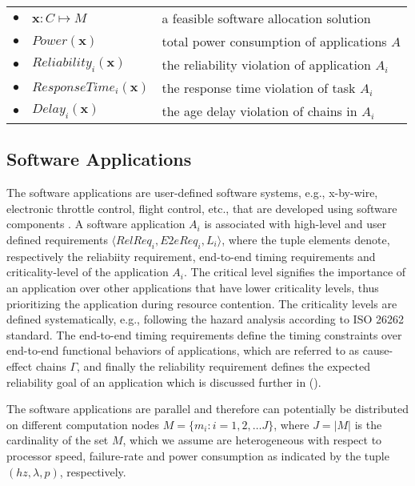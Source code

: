 \begin{table}[]
\begin{tabular}{@{}llp{}@{}}
$\bullet$ & $\textbf{x}:C\mapsto M$            & a feasible software allocation solution                  \\
$\bullet$ & $Power(\textbf{x})$                & total power consumption of applications $A$               \\
$\bullet$ & $Reliability_{i}(\textbf{x})$      & the reliability violation of application $A_i$              \\
$\bullet$ & $ResponseTime_{i}(\textbf{x})$     & the response time violation of task $A_i$                       \\
$\bullet$ & $Delay_{i}(\textbf{x})$            & the age delay violation of chains in $A_i$         \\
\bottomrule
\end{tabular}
\end{table}

\subsection{Software Applications}
The software applications are user-defined software systems, e.g., x-by-wire, electronic throttle control, flight control, etc., that are developed using software components \cite{softwarecomponents}\cite{Crnkovic2002BuildingSystems}. A software application $A_i$ is associated with high-level and user defined requirements $\langle RelReq_i, E2eReq_i,L_i\rangle$, where the tuple elements denote, respectively the reliabiity requirement, end-to-end timing requirements and criticality-level of the application $A_i$. The critical level signifies the importance of an application over other applications that have lower criticality levels, thus prioritizing the application during resource contention. The criticality levels are defined systematically, e.g., following the hazard analysis according to ISO 26262 standard. The end-to-end timing requirements define the timing constraints over end-to-end functional behaviors of applications, which are referred to as cause-effect chains $\Gamma$, and finally the reliability requirement defines the expected reliability goal of an application which is discussed further in (). 

The software applications are parallel and therefore can potentially be distributed on different computation nodes $M =\{m_i:i=1,2,\dots J\}$, where $J=|M|$ is the cardinality of the set $M$, which we assume are heterogeneous with respect to processor speed, failure-rate and power consumption as indicated by the tuple $(hz, \lambda, p)$, respectively. 

